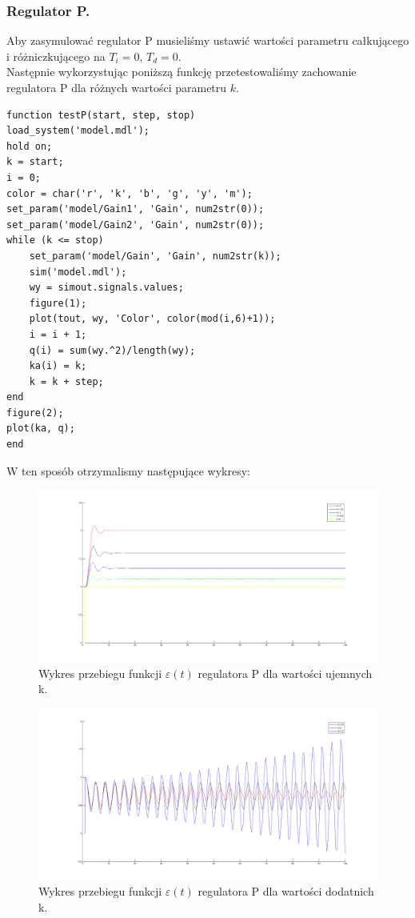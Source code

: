 \documentclass[a4paper,10pt]{article}
\begin{document}
\subsubsection{Regulator P.}
Aby zasymulować regulator P musieliśmy ustawić wartości parametru całkującego i różniczkującego na $T_{i}=0$, $T_{d}=0$. \\
Następnie wykorzystując poniższą funkcję przetestowaliśmy zachowanie regulatora P dla różnych wartości parametru $k$. \\
\begin{lstlisting}[caption=Funkcja testująca regulator P.]
function testP(start, step, stop)
load_system('model.mdl');
hold on;
k = start;
i = 0;
color = char('r', 'k', 'b', 'g', 'y', 'm');
set_param('model/Gain1', 'Gain', num2str(0));
set_param('model/Gain2', 'Gain', num2str(0));
while (k <= stop)
    set_param('model/Gain', 'Gain', num2str(k));
    sim('model.mdl');
    wy = simout.signals.values;
    figure(1);
    plot(tout, wy, 'Color', color(mod(i,6)+1));
    i = i + 1;
    q(i) = sum(wy.^2)/length(wy);
    ka(i) = k;
    k = k + step;
end
figure(2);
plot(ka, q);
end
\end{lstlisting}
W ten sposób otrzymalismy następujące wykresy: \\
\begin{figure}[!h]
    \centering
	\includegraphics[width=140mm]{CW2-regulatorP-eu.png}
	\caption{Wykres przebiegu funkcji $\varepsilon(t)$ regulatora P dla wartości ujemnych k.}
    \label{fig:regulatorPeu}
\end{figure}
\begin{figure}[!h]
    \centering
	\includegraphics[width=140mm]{CW2-regulatorP-ed.png}
	\caption{Wykres przebiegu funkcji $\varepsilon(t)$ regulatora P dla wartości dodatnich k.}
    \label{fig:regulatorPed}
\end{figure}
\end{document}
